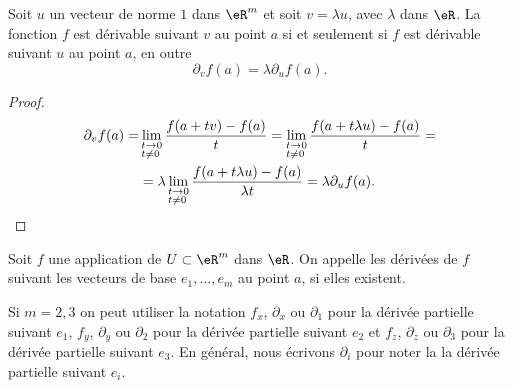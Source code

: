 \begin{proposition}
Soit $u$ un vecteur de norme $1$ dans $\eR^m$ et soit $v=\lambda u$, avec $\lambda$ dans $\eR$. La fonction $f$ est dérivable suivant $v$ au point $a$ si et seulement si $f$ est dérivable suivant $u$ au point $a$, en outre  
\[
\partial_v f(a)=\lambda\partial_u f(a).
\]
\end{proposition}
\begin{proof}
  \begin{equation}
    \begin{aligned}
  \partial_v f(a)=&\lim_{\begin{subarray}{l}
     t\to 0\\ t\neq 0 
    \end{subarray}}\frac{f(a+tv)-f(a)}{t}=\lim_{\begin{subarray}{l}
     t\to 0\\ t\neq 0 
    \end{subarray}}\frac{f(a+t\lambda u)-f(a)}{t}=\\
&=\lambda \lim_{\begin{subarray}{l}
    t\to 0\\ t\neq 0 
  \end{subarray}}\frac{f(a+t\lambda u)-f(a)}{\lambda t}=\lambda \partial_u f(a).    
    \end{aligned}
  \end{equation}
\end{proof}
\begin{definition}
Soit $f$ une application de $U\subset\eR^m$ dans $\eR$. On appelle  les dérivées de $f$ suivant les vecteurs de base $e_1,\ldots,e_m $ au point $a$, si elles existent.
\end{definition}
Si $m=2,3$ on peut utiliser la notation $f_x$, $\partial_x$  ou $\partial_1$ pour la dérivée partielle suivant $e_1$, $f_y$, $\partial_y$  ou $\partial_2$  pour la dérivée partielle suivant $e_2$ et $f_z$,  $\partial_z$  ou $\partial_3$  pour la dérivée partielle suivant $e_3$. En général, nous écrivons $\partial_i$ pour noter la la dérivée partielle suivant $e_i$.  


